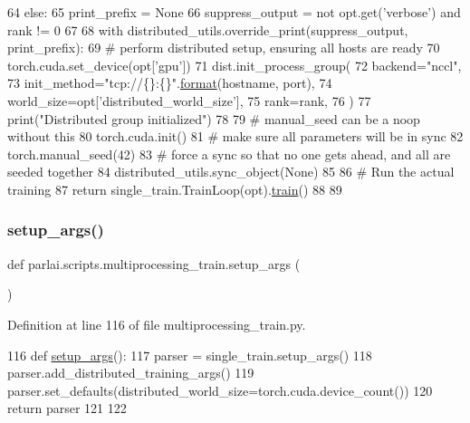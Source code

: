 \begin{DoxyCode}
64     \textcolor{keywordflow}{else}:
65         print\_prefix = \textcolor{keywordtype}{None}
66     suppress\_output = \textcolor{keywordflow}{not} opt.get(\textcolor{stringliteral}{'verbose'}) \textcolor{keywordflow}{and} rank != 0
67 
68     with distributed\_utils.override\_print(suppress\_output, print\_prefix):
69         \textcolor{comment}{# perform distributed setup, ensuring all hosts are ready}
70         torch.cuda.set\_device(opt[\textcolor{stringliteral}{'gpu'}])
71         dist.init\_process\_group(
72             backend=\textcolor{stringliteral}{"nccl"},
73             init\_method=\textcolor{stringliteral}{"tcp://\{\}:\{\}"}.\hyperlink{namespaceparlai_1_1chat__service_1_1services_1_1messenger_1_1shared__utils_a32e2e2022b824fbaf80c747160b52a76}{format}(hostname, port),
74             world\_size=opt[\textcolor{stringliteral}{'distributed\_world\_size'}],
75             rank=rank,
76         )
77         print(\textcolor{stringliteral}{"Distributed group initialized"})
78 
79         \textcolor{comment}{# manual\_seed can be a noop without this}
80         torch.cuda.init()
81         \textcolor{comment}{# make sure all parameters will be in sync}
82         torch.manual\_seed(42)
83         \textcolor{comment}{# force a sync so that no one gets ahead, and all are seeded together}
84         distributed\_utils.sync\_object(\textcolor{keywordtype}{None})
85 
86         \textcolor{comment}{# Run the actual training}
87         \textcolor{keywordflow}{return} single\_train.TrainLoop(opt).\hyperlink{namespaceprojects_1_1mastering__the__dungeon_1_1mturk_1_1tasks_1_1MTD_1_1run_a36a5f4f6f9df0611a6818610518d2cf0}{train}()
88 
89 
\end{DoxyCode}
\mbox{\label{namespaceparlai_1_1scripts_1_1multiprocessing__train_a1ee26bddeb470040cfbceb5ee7a9fa08}} 
\subsubsection{\texorpdfstring{setup\+\_\+args()}{setup\_args()}}
{\footnotesize\ttfamily def parlai.\+scripts.\+multiprocessing\+\_\+train.\+setup\+\_\+args (\begin{DoxyParamCaption}{ }\end{DoxyParamCaption})}



Definition at line 116 of file multiprocessing\+\_\+train.\+py.


\begin{DoxyCode}
116 \textcolor{keyword}{def }\hyperlink{namespaceparlai_1_1scripts_1_1multiprocessing__train_a1ee26bddeb470040cfbceb5ee7a9fa08}{setup\_args}():
117     parser = single\_train.setup\_args()
118     parser.add\_distributed\_training\_args()
119     parser.set\_defaults(distributed\_world\_size=torch.cuda.device\_count())
120     \textcolor{keywordflow}{return} parser
121 
122 
\end{DoxyCode}

